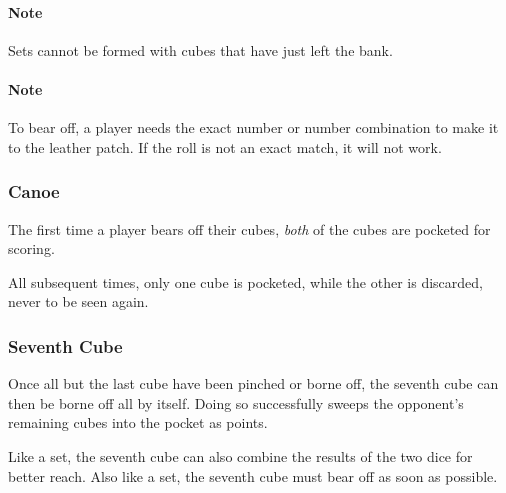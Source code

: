 \paragraph{Note} Sets cannot be formed with cubes that have just left the bank.

\paragraph{Note} To bear off, a player needs the exact number or number combination to make it to the leather patch. If the roll is not an exact match, it will not work.

\subsubsection{Canoe}
The first time a player bears off their cubes, \textit{both} of the cubes are pocketed for scoring.

All subsequent times, only one cube is pocketed, while the other is discarded, never to be seen again.

\subsubsection{Seventh Cube}
Once all but the last cube have been pinched or borne off, the seventh cube can then be borne off all by itself.
Doing so successfully sweeps the opponent's remaining cubes into the pocket as points.

Like a set, the seventh cube can also combine the results of the two dice for better reach.
Also like a set, the seventh cube must bear off as soon as possible.